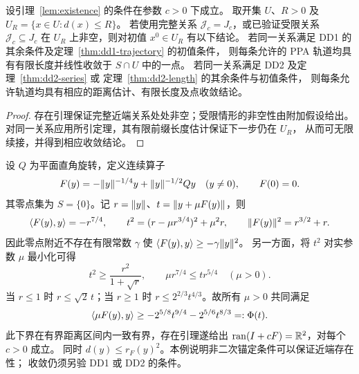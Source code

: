 \begin{theorem}[DD3]\label{thm:dd3}
设引理~\ref{lem:existence} 的条件在参数 $c>0$ 下成立。
取开集 $U$、$R>0$ 及 $U_R=\{x\in U:d(x)\le R\}$。
若使用完整关系 $\mathcal J_c=J_c$，或已验证受限关系
$\mathcal J_c\subseteq J_c$ 在 $U_R$ 上非空，则对初值 $x^0\in U_R$ 有以下结论。
若同一关系满足 DD1 的其余条件及定理~\ref{thm:dd1-trajectory} 的初值条件，
则每条允许的 PPA 轨道均具有有限长度并线性收敛于 $S\cap U$ 中的一点。
若同一关系满足 DD2 及定理~\ref{thm:dd2-series} 或
定理~\ref{thm:dd2-length} 的其余条件与初值条件，
则每条允许轨道均具有相应的距离估计、有限长度及点收敛结论。
\end{theorem}

\begin{proof}
存在引理保证完整近端关系处处非空；受限情形的非空性由附加假设给出。
对同一关系应用所引定理，其有限前缀长度估计保证下一步仍在 $U_R$，
从而可无限续接，并得到相应收敛结论。
\end{proof}

\begin{example}[非二次条件下的全局存在性]\label{ex:dd3-nonquadratic}
设 $Q$ 为平面直角旋转，定义连续算子
\[
 F(y)=-\lVert y\rVert^{-1/4}y+\lVert y\rVert^{-1/2}Qy\quad(y\ne0),\qquad F(0)=0.
\]
其零点集为 $S=\{0\}$。记 $r=\lVert y\rVert$、$t=\lVert y+\mu F(y)\rVert$，则
\begin{equation}\label{eq:dd3-nonquadratic-identities}
 \langle F(y),y\rangle=-r^{7/4},\qquad
 t^2=(r-\mu r^{3/4})^2+\mu^2r,\qquad
 \lVert F(y)\rVert^2=r^{3/2}+r.
\end{equation}
因此零点附近不存在有限常数 $\gamma$ 使
$\langle F(y),y\rangle\ge-\gamma\lVert y\rVert^2$。
另一方面，将 $t^2$ 对实参数 $\mu$ 最小化可得
\[
 t^2\ge\frac{r^2}{1+\sqrt r},\qquad \mu r^{7/4}\le tr^{5/4}\quad(\mu>0).
\]
当 $r\le1$ 时 $r\le\sqrt2\,t$；当 $r\ge1$ 时
$r\le2^{2/3}t^{4/3}$。故所有 $\mu>0$ 共同满足
\[
 \langle \mu F(y),y\rangle\ge-2^{5/8}t^{9/4}-2^{5/6}t^{8/3}=:\Phi(t).
\]
此下界在有界距离区间内一致有界，存在引理遂给出
$\operatorname{ran}(I+cF)=\mathbb R^2$，对每个 $c>0$ 成立。
同时 $d(y)\le r_F(y)^2$。本例说明非二次锚定条件可以保证近端存在性；
收敛仍须另验 DD1 或 DD2 的条件。
\end{example}
